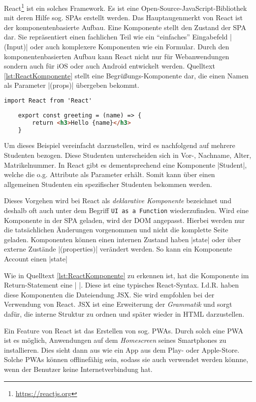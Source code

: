 React\footnote{\url{https://reactjs.org}} ist ein solches Framework. 
Es ist eine Open-Source-JavaScript-Bibliothek mit deren Hilfe sog. \acfp{SPA} erstellt werden.\autocite[ ][]{hartmann2019react} 
Das Hauptaugenmerkt von React ist der komponentenbasierte Aufbau. 
Eine Komponente stellt den Zustand der \acs{SPA} dar. 
Sie repräsentiert einen fachlichen Teil wie \zb ein \enquote{einfaches} Eingabefeld \jinline|(Input)| oder auch komplexere Komponenten wie ein Formular.
Durch den komponentenbasierten Aufbau kann React nicht nur für Webanwendungen sondern auch für iOS oder auch Android entwickelt werden. 
Quelltext \vref{lst:ReactKomponente} stellt eine Begrüßungs-Komponente dar, die einen Namen als Parameter \jinline|(props)| übergeben bekommt. 

\begin{lstlisting}[caption={React-Komponente: Greeting},label={lst:ReactKomponente},language=HTML, showstringspaces={false}]
	import React from 'React'
	
	export const greeting = (name) => {
		return <h3>Hello {name}</h3>
	}
\end{lstlisting}

Um dieses Beispiel vereinfacht darzustellen, wird es nachfolgend auf mehrere Studenten bezogen. 
Diese Studenten unterscheiden sich \zb in Vor-, Nachname, Alter, Matrikelnummer. 
In React gibt es dementsprechend eine Komponente \jinline|Student|, welche die o.g. Attribute als Parameter erhält. 
Somit kann über einen allgemeinen Studenten ein spezifischer Studenten bekommen werden. 

Dieses Vorgehen wird bei React als \emph{deklarative Komponente} bezeichnet und deshalb oft auch unter dem Begriff \texttt{UI as a Function} wiederzufinden. \autocite[ ][]{hartmann2019react} 
Wird eine Komponente in der \acs{SPA} geladen, wird der \acs{DOM} angepasst. 
Hierbei werden nur die tatsächlichen Änderungen vorgenommen und nicht die komplette Seite geladen. \newline
Komponenten können einen internen Zustand haben \jinline|state| oder über externe Zustände \jinline|(properties)| verändert werden. So kann \zb ein Komponente Account einen \jinline|state| 

Wie in Quelltext \vref{lst:ReactKomponente} zu erkennen ist, hat die Komponente im Return-Statement eine \jinline|{ }|. 
Diese ist eine typisches React-Syntax. 
I.d.R. haben diese Komponenten die Dateiendung \acf{JSX}. 
Sie wird empfohlen bei der Verwendung von React. 
\acs{JSX} ist eine Erweiterung der \emph{Grammatik} und sorgt dafür, die interne Struktur zu ordnen und später wieder in \acs{HTML} darzustellen.\autocite[ ][]{WasIstJSX} 

Ein Feature von React ist das Erstellen von sog. \acfp{PWA}. 
Durch solch eine \acs{PWA} ist es möglich, Anwendungen auf dem \emph{Homescreen} seines Smartphones zu installieren. 
Dies sieht dann aus wie ein App aus dem Play- oder Apple-Store. 
Solche \acsp*{PWA} können offlinefähig sein, sodass sie auch verwendet werden könnne, wenn der Benutzer keine Internetverbindung hat. \autocite[ ][]{hartmann2019react} 

